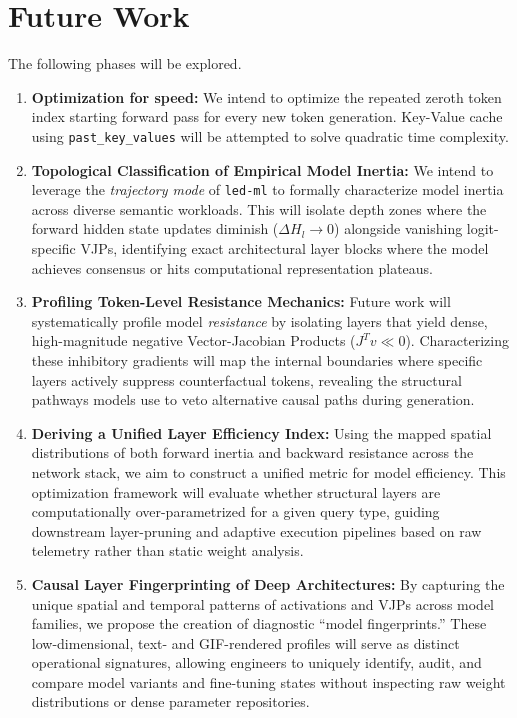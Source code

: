 \documentclass[10pt,conference]{IEEEtran}
\begin{document}
\section{Future Work}
\label{sec:future_work}
The following phases will be explored.
\begin{enumerate}
    \item \textbf{Optimization for speed:} We intend to optimize the repeated zeroth token index starting forward pass for every new token generation. Key-Value cache using \texttt{past\_key\_values} will be attempted to solve quadratic time complexity.

    \item \textbf{Topological Classification of Empirical Model Inertia:} We intend to leverage the \textit{trajectory mode} of \texttt{led-ml} to formally characterize model inertia across diverse semantic workloads. This will isolate depth zones where the forward hidden state updates diminish ($\Delta H_l \to 0$) alongside vanishing logit-specific VJPs, identifying exact architectural layer blocks where the model achieves consensus or hits computational representation plateaus.
    
    \item \textbf{Profiling Token-Level Resistance Mechanics:} Future work will systematically profile model \textit{resistance} by isolating layers that yield dense, high-magnitude negative Vector-Jacobian Products ($J^T v \ll 0$). Characterizing these inhibitory gradients will map the internal boundaries where specific layers actively suppress counterfactual tokens, revealing the structural pathways models use to veto alternative causal paths during generation.
    
    \item \textbf{Deriving a Unified Layer Efficiency Index:} Using the mapped spatial distributions of both forward inertia and backward resistance across the network stack, we aim to construct a unified metric for model efficiency. This optimization framework will evaluate whether structural layers are computationally over-parametrized for a given query type, guiding downstream layer-pruning and adaptive execution pipelines based on raw telemetry rather than static weight analysis.
    
    \item \textbf{Causal Layer Fingerprinting of Deep Architectures:} By capturing the unique spatial and temporal patterns of activations and VJPs across model families, we propose the creation of diagnostic ``model fingerprints.'' These low-dimensional, text- and GIF-rendered profiles will serve as distinct operational signatures, allowing engineers to uniquely identify, audit, and compare model variants and fine-tuning states without inspecting raw weight distributions or dense parameter repositories.

\end{enumerate}
\end{document}
